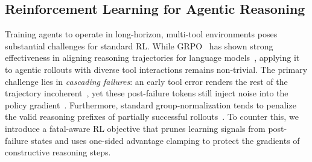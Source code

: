 \subsection{Reinforcement Learning for Agentic Reasoning}
Training agents to operate in long-horizon, multi-tool environments poses substantial challenges for standard RL. While GRPO~\citep{shao2024deepseekmath} has shown strong effectiveness in aligning reasoning trajectories for language models~\citep{guo2025deepseek,chen2025advancing,chen2025ares,feng2025video, feng2025onethinker, hu2026openvlthinkerv2generalistmultimodalreasoning}, applying it to agentic rollouts with diverse tool interactions remains non-trivial. The primary challenge lies in \textit{cascading failures}: an early tool error renders the rest of the trajectory incoherent~\citep{vuddanti2025paladin, zhu2025where, zheng2026deepeyesincentivizingthinkingimages,dong2025agenticreinforcedpolicyoptimization}, yet these post-failure tokens still inject noise into the policy gradient~\citep{REGRPO2025, deng2026group, CoRPO2025}. Furthermore, standard group-normalization tends to penalize the valid reasoning prefixes of partially successful rollouts~\citep{huang2026vision}. To counter this, we introduce a fatal-aware RL objective that prunes learning signals from post-failure states and uses one-sided advantage clamping to protect the gradients of constructive reasoning steps.

